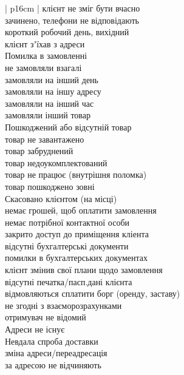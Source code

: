 \begin{mytable*}{ | p{16cm} | }
	\hline
	клієнт не зміг бути вчасно \\
	\hline
	зачинено, телефони не відповідають \\
	\hline
	короткий робочий день, вихідний \\
	\hline
	клієнт зʼїхав з адреси \\
	\hline
	Помилка в замовленні \\
	\nopagebreak\quad не замовляли взагалі \\
	\nopagebreak\quad замовляли на інший день \\
	\nopagebreak\quad замовляли на іншу адресу \\
	\nopagebreak\quad замовляли на інший час \\
	\nopagebreak\quad замовляли інший товар \\
	\hline
	Пошкоджений або відсутній товар \\
	\nopagebreak\quad товар не завантажено  \\
	\nopagebreak\quad товар забруднений \\
	\nopagebreak\quad товар недоукомплектований \\
	\nopagebreak\quad товар не працює (внутрішня поломка) \\
	\nopagebreak\quad товар пошкоджено зовні \\
	\hline
	Скасовано клієнтом (на місці) \\
	\hline
	немає грошей, щоб оплатити замовлення \\
	\hline
	немає потрібної контактної особи \\
	\hline
	закрито доступ до приміщення кліента \\
	\hline
	відсутні бухгалтерські документи \\
	\hline
	помилки в бухгалтерських документах \\
	\hline
	клієнт змінив свої плани щодо замовлення \\
	\hline
	відсутні печатка/пасп.дані клієнта \\
	\hline
	відмовляються сплатити борг (оренду, заставу) \\
	\hline
	не згодні з взаєморозрахунками \\
	\hline
	отримувач не відомий \\
	\hline
	Адреси не існує \\
	\hline
	Невдала спроба доставки \\
	\nopagebreak\quad зміна адреси/переадресація \\
	\nopagebreak\quad за адресою не відчиняють \\

\end{mytable*}
